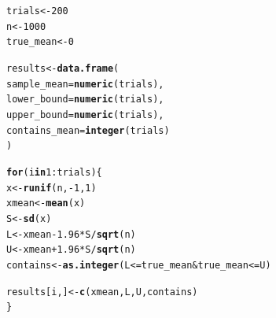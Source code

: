 \documentclass[12pt]{article}\usepackage[]{graphicx}\usepackage[]{xcolor}
\makeatletter
\newcommand{\hlnum}[1]{\textcolor[rgb]{0.686,0.059,0.569}{#1}}%
\newcommand{\hlopt}[1]{\textcolor[rgb]{0,0,0}{#1}}%
\newcommand{\hldef}[1]{\textcolor[rgb]{0.345,0.345,0.345}{#1}}%
\newcommand{\hlkwa}[1]{\textcolor[rgb]{0.161,0.373,0.58}{\textbf{#1}}}%
\newcommand{\hlkwb}[1]{\textcolor[rgb]{0.69,0.353,0.396}{#1}}%
\newcommand{\hlkwc}[1]{\textcolor[rgb]{0.333,0.667,0.333}{#1}}%
\newcommand{\hlkwd}[1]{\textcolor[rgb]{0.737,0.353,0.396}{\textbf{#1}}}%
\newenvironment{kframe}{%
 \def\at@end@of@kframe{}%
 \ifinner\ifhmode%
  \def\at@end@of@kframe{\end{minipage}}%
  \begin{minipage}{\columnwidth}%
 \fi\fi%
 \def\FrameCommand##1{\hskip\@totalleftmargin \hskip-\fboxsep
 \colorbox{shadecolor}{##1}\hskip-\fboxsep
     \hskip-\linewidth \hskip-\@totalleftmargin \hskip\columnwidth}%
 \MakeFramed {\advance\hsize-\width
   \@totalleftmargin\z@ \linewidth\hsize
   \@setminipage}}%
 {\par\unskip\endMakeFramed%
 \at@end@of@kframe}
\newenvironment{knitrout}{}{} %
\makeatother
\begin{document}
\begin{knitrout}
\color{fgcolor}\begin{kframe}
\begin{alltt}
\hldef{trials} \hlkwb{<-} \hlnum{200}
\hldef{n} \hlkwb{<-} \hlnum{1000}
\hldef{true_mean} \hlkwb{<-} \hlnum{0}

\hldef{results} \hlkwb{<-} \hlkwd{data.frame}\hldef{(}
  \hlkwc{sample_mean} \hldef{=} \hlkwd{numeric}\hldef{(trials),}
  \hlkwc{lower_bound} \hldef{=} \hlkwd{numeric}\hldef{(trials),}
  \hlkwc{upper_bound} \hldef{=} \hlkwd{numeric}\hldef{(trials),}
  \hlkwc{contains_mean} \hldef{=} \hlkwd{integer}\hldef{(trials)}
\hldef{)}

\hlkwa{for} \hldef{(i} \hlkwa{in} \hlnum{1}\hlopt{:}\hldef{trials)\{}
  \hldef{x} \hlkwb{<-} \hlkwd{runif}\hldef{(n,} \hlopt{-}\hlnum{1}\hldef{,} \hlnum{1}\hldef{)}
  \hldef{xmean} \hlkwb{<-} \hlkwd{mean}\hldef{(x)}
  \hldef{S} \hlkwb{<-} \hlkwd{sd}\hldef{(x)}
  \hldef{L} \hlkwb{<-} \hldef{xmean} \hlopt{-} \hlnum{1.96} \hlopt{*} \hldef{S}\hlopt{/}\hlkwd{sqrt}\hldef{(n)}
  \hldef{U} \hlkwb{<-} \hldef{xmean} \hlopt{+} \hlnum{1.96} \hlopt{*} \hldef{S}\hlopt{/}\hlkwd{sqrt}\hldef{(n)}
  \hldef{contains} \hlkwb{<-} \hlkwd{as.integer}\hldef{(L} \hlopt{<=} \hldef{true_mean} \hlopt{&} \hldef{true_mean} \hlopt{<=} \hldef{U)}

  \hldef{results[i, ]} \hlkwb{<-} \hlkwd{c}\hldef{(xmean, L, U, contains)}
\hldef{\}}


\end{alltt}
\end{kframe}
\end{knitrout}
\end{document}
